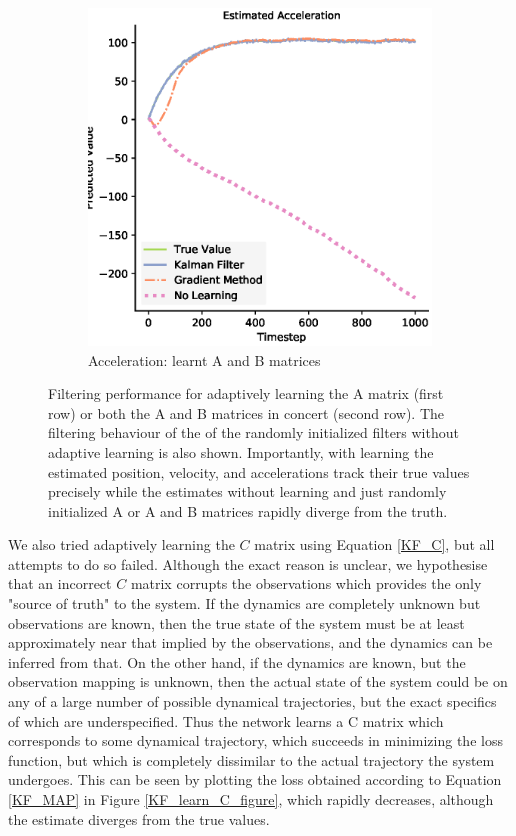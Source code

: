 \begin{figure}[H]
\begin{subfigure}{0.32\textwidth}
 \includegraphics[width=.8\linewidth]{chapter_3_figures/Estimated_Acceleration_AB_matrix.eps}
 \caption{Acceleration: learnt A and B matrices}
 \end{subfigure}
 \caption{Filtering performance for adaptively learning the A matrix (first row) or both the A and B matrices in concert (second row). The filtering behaviour of the of the randomly initialized filters without adaptive learning is also shown. Importantly, with learning the estimated position, velocity, and accelerations track their true values precisely while the estimates without learning and just randomly initialized A or A and B matrices rapidly diverge from the truth.}
\label{KF_learn_AB_figure}
\end{figure}

We also tried adaptively learning the $C$ matrix using Equation \ref{KF_C}, but all attempts to do so failed. Although the exact reason is unclear, we hypothesise that an incorrect $C$ matrix corrupts the observations which provides the only "source of truth" to the system. If the dynamics are completely unknown but observations are known, then the true state of the system must be at least approximately near that implied by the observations, and the dynamics can be inferred from that. On the other hand, if the dynamics are known, but the observation mapping is unknown, then the actual state of the system could be on any of a large number of possible dynamical trajectories, but the exact specifics of which are underspecified. Thus the network learns a C matrix which corresponds to some dynamical trajectory, which succeeds in minimizing the loss function, but which is completely dissimilar to the actual trajectory the system undergoes. This can be seen by plotting the loss obtained according to Equation \ref{KF_MAP} in Figure \ref{KF_learn_C_figure}, which rapidly decreases, although the estimate diverges from the true values.

